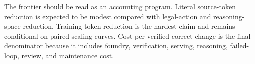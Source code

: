 The frontier should be read as an accounting program. Literal source-token reduction is expected to be modest compared with legal-action and reasoning-space reduction. Training-token reduction is the hardest claim and remains conditional on paired scaling curves. Cost per verified correct change is the final denominator because it includes foundry, verification, serving, reasoning, failed-loop, review, and maintenance cost.

